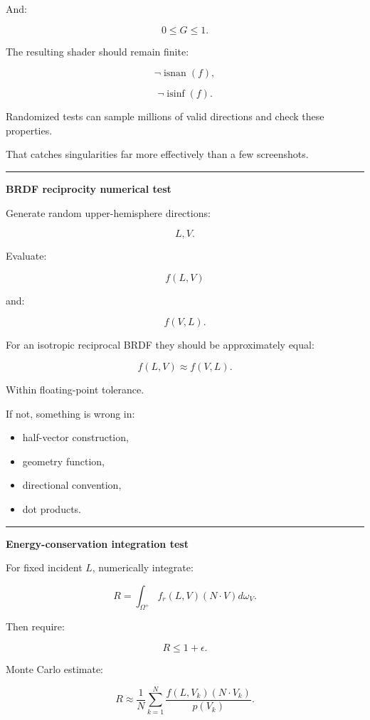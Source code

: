 And:

\[
0\le G\le1.
\]

The resulting shader should remain finite:

\[
\neg\operatorname{isnan}(f),
\]

\[
\neg\operatorname{isinf}(f).
\]

Randomized tests can sample millions of valid directions and check these properties.

That catches singularities far more effectively than a few screenshots.

\begin{center}\rule{0.5\linewidth}{0.5pt}\end{center}

\textbf{BRDF reciprocity numerical test}

Generate random upper-hemisphere directions:

\[
L,V.
\]

Evaluate:

\[
f(L,V)
\]

and:

\[
f(V,L).
\]

For an isotropic reciprocal BRDF they should be approximately equal:

\[
\boxed{
f(L,V)
\approx
f(V,L).
}
\]

Within floating-point tolerance.

If not, something is wrong in:

\begin{itemize}
\tightlist
\item
  half-vector construction,
\item
  geometry function,
\item
  directional convention,
\item
  dot products.
\end{itemize}

\begin{center}\rule{0.5\linewidth}{0.5pt}\end{center}

\textbf{Energy-conservation integration test}

For fixed incident \(L\), numerically integrate:

\[
R=
\int_{\Omega^+}
f_r(L,V)
(N\cdot V)
d\omega_V.
\]

Then require:

\[
R\le1+\epsilon.
\]

Monte Carlo estimate:

\[
R
\approx
\frac1N
\sum_{k=1}^N
\frac{
f(L,V_k)
(N\cdot V_k)
}{
p(V_k)
}.
\]

